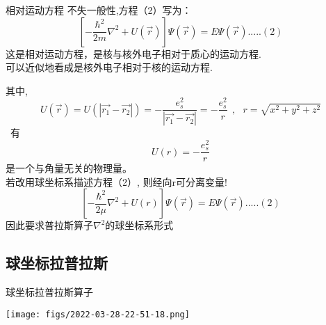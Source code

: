 	{相对运动方程}
	不失一般性,方程（2）写为：
	\begin{equation*}
		\left[-\frac{\hbar^2}{2 m} \nabla ^2 +U(\vec{r}) \right] \Psi (\vec{r}) =E \Psi (\vec{r})   ..... (2)
	\end{equation*}
	这是相对运动方程，是核与核外电子相对于质心的运动方程.\\
	可以近似地看成是核外电子相对于核的运动方程.
	


	其中,
	\begin{equation*}
		U(\vec{r})=U(| \vec{r_1}-\vec{r_2} | )=-\frac{e_s ^2}{| \vec{r_1}-\vec{r_2} |} = -\frac{e_s ^2}{r} ~~,~~~ r =\sqrt{x^2+y^2+z^2}
	\end{equation*}
	 有
	\begin{equation*}
		U(r)=-\frac{e_s ^2}{r}
	\end{equation*}	
	是一个与角量无关的物理量。 \\
	若改用球坐标系描述方程（2）, 则经向r可分离变量!\\
	\begin{equation*}
		\left[-\frac{\hbar^2}{2 \mu} \nabla ^2 +U(r) \right] \Psi (\vec{r}) =E \Psi (\vec{r})   ..... (2)
	\end{equation*}
	因此要求普拉斯算子$\nabla ^2$的球坐标系形式
		

\subsection{球坐标拉普拉斯}


	{球坐标拉普拉斯算子}
	\begin{center}
		   \texttt{[image: figs/2022-03-28-22-51-18.png]}
	\end{center}



